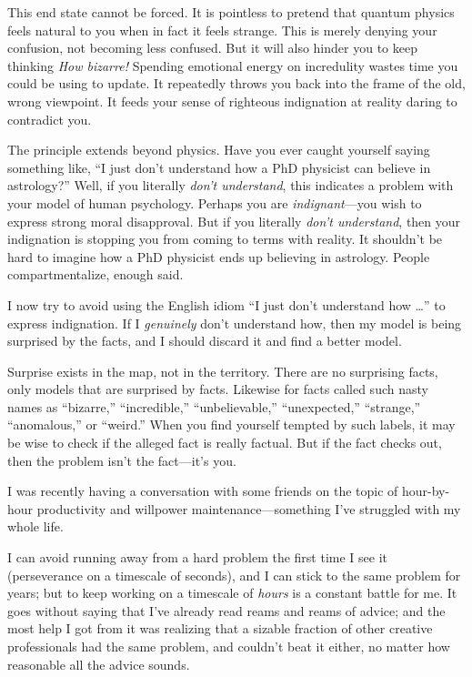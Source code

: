 {
 This end state cannot be forced. It is pointless to pretend that
quantum physics feels natural to you when in fact it feels strange.
This is merely denying your confusion, not becoming less confused. But
it will also hinder you to keep thinking \textit{How bizarre!} Spending
emotional energy on incredulity wastes time you could be using to
update. It repeatedly throws you back into the frame of the old, wrong
viewpoint. It feeds your sense of righteous indignation at reality
daring to contradict you.}

{
 The principle extends beyond physics. Have you ever caught
yourself saying something like, ``I just
don't understand how a PhD physicist can believe in
astrology?'' Well, if you literally
\textit{don't understand}, this indicates a problem
with your model of human psychology. Perhaps you are
\textit{indignant}{}---you wish to express strong moral disapproval.
But if you literally \textit{don't understand}, then
your indignation is stopping you from coming to terms with reality. It
shouldn't be hard to imagine how a PhD physicist ends
up believing in astrology. People compartmentalize, enough said.}

{
 I now try to avoid using the English idiom ``I
just don't understand how \ldots'' to
express indignation. If I \textit{genuinely} don't
understand how, then my model is being surprised by the facts, and I
should discard it and find a better model.}

{
 Surprise exists in the map, not in the territory. There are no
surprising facts, only models that are surprised by facts. Likewise for
facts called such nasty names as
``bizarre,''
``incredible,''
``unbelievable,''
``unexpected,''
``strange,''
``anomalous,'' or
``weird.'' When you find yourself
tempted by such labels, it may be wise to check if the alleged fact is
really factual. But if the fact checks out, then the problem
isn't the fact---it's you.}

\myendsectiontext


{
 I was recently having a conversation with some friends on the
topic of hour-by-hour productivity and willpower
maintenance---something I've struggled with my whole
life. }

{
 I can avoid running away from a hard problem the first time I see
it (perseverance on a timescale of seconds), and I can stick to the
same problem for years; but to keep working on a timescale of
\textit{hours} is a constant battle for me. It goes without saying that
I've already read reams and reams of advice; and the
most help I got from it was realizing that a sizable fraction of other
creative professionals had the same problem, and
couldn't beat it either, no matter how reasonable all
the advice sounds.}

